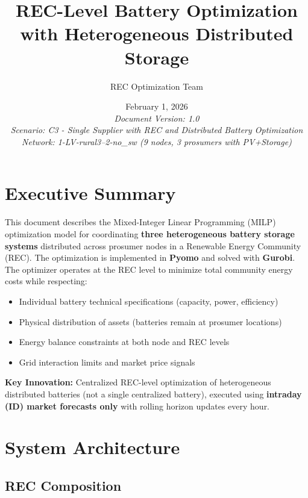 \documentclass[11pt,a4paper]{article}
\title{\textbf{REC-Level Battery Optimization with Heterogeneous Distributed Storage}}
\author{REC Optimization Team}
\date{February 1, 2026\\
\vspace{0.3cm}
\textit{Document Version: 1.0}\\
\textit{Scenario: C3 - Single Supplier with REC and Distributed Battery Optimization}\\
\textit{Network: 1-LV-rural3--2-no\_sw (9 nodes, 3 prosumers with PV+Storage)}}
\begin{document}
\maketitle

\section{Executive Summary}

This document describes the Mixed-Integer Linear Programming (MILP) optimization model for coordinating \textbf{three heterogeneous battery storage systems} distributed across prosumer nodes in a Renewable Energy Community (REC). The optimization is implemented in \textbf{Pyomo} and solved with \textbf{Gurobi}. The optimizer operates at the REC level to minimize total community energy costs while respecting:

\begin{itemize}
    \item Individual battery technical specifications (capacity, power, efficiency)
    \item Physical distribution of assets (batteries remain at prosumer locations)
    \item Energy balance constraints at both node and REC levels
    \item Grid interaction limits and market price signals
\end{itemize}

\textbf{Key Innovation:} Centralized REC-level optimization of heterogeneous distributed batteries (not a single centralized battery), executed using \textbf{intraday (ID) market forecasts only} with rolling horizon updates every hour.

\section{System Architecture}

\subsection{REC Composition}
\end{document}
